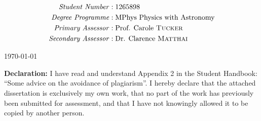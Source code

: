 \documentclass[11pt]{article}
\begin{document}
\begin{titlepage}
	
\begin{align*}
\text{\emph{Student Number}}&: \text{1265898} \\
\text{\emph{Degree Programme}}&: \text{MPhys Physics with Astronomy} \\
\text{\emph{Primary Assessor}}&: \text{Prof. Carole \textsc{Tucker}} \\
\text{\emph{Secondary Assessor}}&: \text{Dr. Clarence \textsc{Matthai}} \\
\end{align*}
%


	{\large \today}\\[1cm] %
	
\begin{flushleft}
\textbf{Declaration:} I have read and understand Appendix 2 in the Student Handbook: “Some advice on the avoidance of plagiarism”. I hereby declare that the attached 
dissertation is exclusively my own work, that no part of the work has previously been 
submitted for assessment, and that I have not knowingly allowed it to be copied by another person.
\end{flushleft}

	
	\vfill %
	
\end{titlepage}
\end{document}

